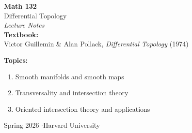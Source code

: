 \begin{titlepage}
    \centering
    \vspace*{2cm}

    {\Huge\bfseries Math 132\\[0.3cm]}
    {\Large Differential Topology}\\[1.5cm]

    {\large\itshape Lecture Notes}\\[2cm]

    {\normalsize
    \textbf{Textbook:}\\[0.3cm]
    Victor Guillemin \& Alan Pollack, \textit{Differential Topology} (1974)
    }\\[2cm]

    {\normalsize
    \textbf{Topics:}\\[0.3cm]
    \begin{enumerate}[label=(\roman*)]
        \item Smooth manifolds and smooth maps
        \item Transversality and intersection theory
        \item Oriented intersection theory and applications
    \end{enumerate}
    }\vspace{2cm}

    {\small Spring 2026 \quad$\cdot$\quad Harvard University}

    \vfill
\end{titlepage}
